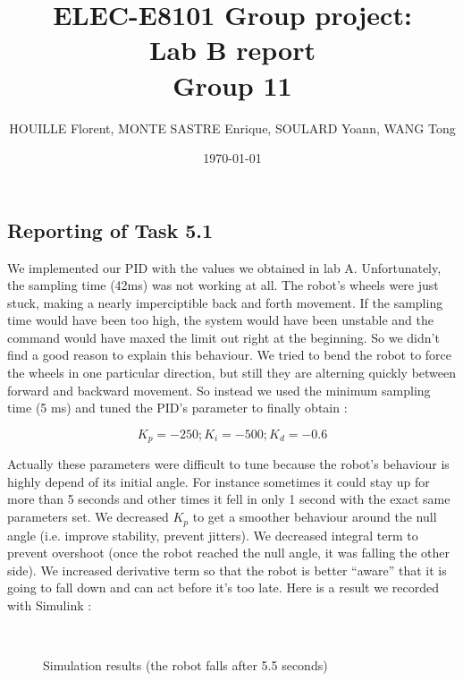 \documentclass[11pt]{article}
\title{\Huge ELEC-E8101 Group project: \\ Lab B report \\ Group 11}
\date{\today}
\author{HOUILLE Florent, MONTE SASTRE Enrique, SOULARD Yoann, WANG Tong}
\begin{document}
\maketitle

\subsection*{Reporting of Task 5.1}

We implemented our PID with the values we obtained in lab A. Unfortunately, the sampling time (42ms) was not working at all. The robot's wheels were just stuck, making a nearly imperciptible back and forth movement. If the sampling time would have been too high, the system would have been unstable and the command would have maxed the limit out right at the beginning. So we didn't find a good reason to explain this behaviour. We tried to bend the robot to force the wheels in one particular direction, but still they are alterning quickly between forward and backward movement.
So instead we used the minimum sampling time (5 ms) and tuned the PID's parameter to finally obtain :

\begin{equation*}
K_p=-250   ;   K_i=-500   ;   K_d=-0.6
\end{equation*}

Actually these parameters were difficult to tune because the robot's behaviour is highly depend of its initial angle. For instance sometimes it could stay up for more than 5 seconds and other times it fell in only 1 second with the exact same parameters set. We decreased $K_p$ to get a smoother behaviour around the null angle (i.e. improve stability, prevent jitters). We decreased integral term to prevent overshoot (once the robot reached the null angle, it was falling the other side). We increased derivative term so that the robot is better ``aware'' that it is going to fall down and can act before it's too late. Here is a result we recorded with Simulink :

\begin{figure}[H]
\centering
{}
  \\
  \caption{Simulation results (the robot falls after 5.5 seconds)}
  \label{fig:fig1}
\end{figure}
\end{document}
